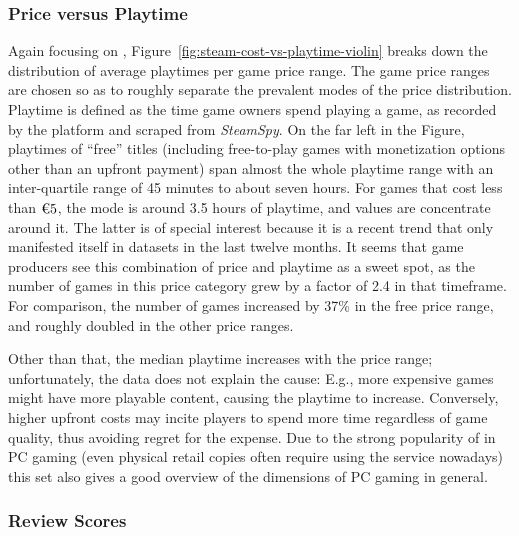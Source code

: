 \subsubsection{Price versus Playtime}
Again focusing on \steam,
Figure~\ref{fig:steam-cost-vs-playtime-violin} breaks down the
distribution of average playtimes per game price range. The game price
ranges are chosen so as to roughly separate the prevalent modes of the
price distribution.
Playtime is defined as the time game owners spend playing a game, as
recorded by the \steam platform and scraped from \textit{SteamSpy}.
On the far left in the Figure, playtimes of ``free'' titles
(including free-to-play games with monetization options other than an
upfront payment) span almost the whole playtime range with an
inter-quartile range of 45 minutes to about seven hours.
For games that cost less than $\text{\texteuro} 5$, the mode is around
3.5 hours of playtime, and values are concentrate around it. The
latter is of special interest because it is a recent trend that only
manifested itself in datasets in the last twelve months. It seems that
game producers see this combination of price and playtime as a sweet
spot, as the number of games in this price category grew by a factor of
2.4 in that timeframe. For comparison, the number of games
increased by 37\% in the free price range, and roughly doubled
in the other price ranges.

Other than that, the median playtime increases with the price range;
unfortunately, the data does not explain the cause: E.g., more expensive
games might have more playable content, causing the playtime to
increase. Conversely, higher upfront costs may incite players to spend
more time regardless of game quality, thus avoiding regret for the
expense.
Due to the strong popularity of \steam in \gls{PC} gaming (even physical
retail copies often require using the service nowadays) this set also
gives a good overview of the dimensions of \gls{PC} gaming in general.


\subsubsection{Review Scores}


